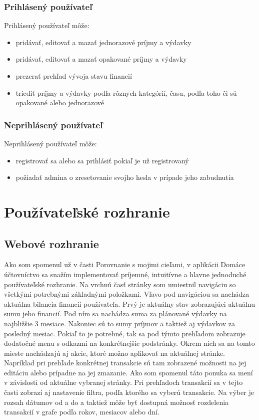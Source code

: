 \documentclass[12pt,onesided]{book}
\begin{document}
\subsubsection{Prihlásený používateľ}
Prihlásený používateľ môže:
\begin{itemize}
\item{pridávať, editovať a mazať jednorazové príjmy a výdavky}
\item{pridávať, editovať a mazať opakované príjmy a výdavky}
\item{prezerať prehľad vývoja stavu financií}
\item{triediť príjmy a výdavky podľa rôznych kategórií, času, podľa toho či sú opakované alebo jednorazové}
\end{itemize}

\subsubsection{Neprihlásený používateľ}
Neprihlásený používateľ môže:
\begin{itemize}
\item{registrovať sa alebo sa prihlásiť pokiaľ je už registrovaný}
\item{požiadať admina o zresetovanie svojho hesla v prípade jeho zabudnutia}
\end{itemize}

\section{Používateľské rozhranie}
\subsection{Webové rozhranie}
Ako som spomenul už v časti Porovnanie s mojimi cieľami, v aplikácii Domáce účtovníctvo sa snažím implementovať príjemné, intuitívne a hlavne jednoduché používateľské rozhranie. Na vrchnú časť stránky som umiestnil navigáciu so všetkými potrebnými základnými položkami. Vľavo pod navigáciou sa nachádza aktuálna bilancia financií používateľa. Prvý je aktuálny stav zobrazujúci aktuálnu sumu jeho financií. Pod ním sa nachádza suma za plánované výdavky na najbližšie 3 mesiace. Nakoniec sú to sumy príjmov a taktiež aj výdavkov za posledný mesiac. Pokiaľ to je potrebné, tak sa pod týmto prehľadom zobrazuje dodatočné menu s odkazmi na konkrétnejšie podstránky. Okrem nich sa na tomto mieste nachádzajú aj akcie, ktoré možno aplikovať na aktuálnej stránke. Napríklad pri prehľade konkrétnej transakcie sú tam zobrazené možnosti na jej editáciu alebo prípadne na jej zmazanie. Ako som spomenul táto ponuka sa mení v závislosti od aktuálne vybranej stránky. Pri prehľadoch transakcií sa v tejto časti zobrazí aj nastavenie filtra, podľa ktorého sa vyberú transakcie. Na výber je rozsah dátumov od a do a taktiež môže byť dostupná možnosť rozdelenia transakcií v grafe podľa rokov, mesiacov alebo dní.
\end{document}

